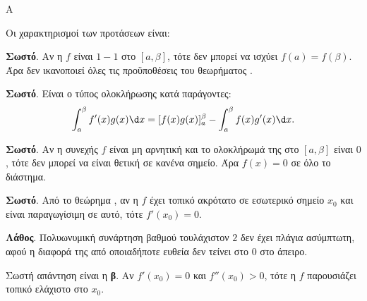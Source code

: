 \begin{thema}{Α}
\begin{erwthma}
\item {}

\item {}

\item {}

\item Οι χαρακτηρισμοί των προτάσεων είναι:
\begin{alist}
\item \textbf{Σωστό}. Αν η $f$ είναι $1-1$ στο $[a,\beta]$, τότε δεν μπορεί να ισχύει $f(a)=f(\beta)$. Άρα δεν ικανοποιεί όλες τις προϋποθέσεις του θεωρήματος .
\item \textbf{Σωστό}. Είναι ο τύπος ολοκλήρωσης κατά παράγοντες:
\[ \dint_a^\beta f'(x)g(x)\d x=[f(x)g(x)]_a^\beta-\dint_a^\beta f(x)g'(x)\d x. \]
\item \textbf{Σωστό}. Αν η συνεχής $f$ είναι μη αρνητική και το ολοκλήρωμά της στο $[a,\beta]$ είναι $0$, τότε δεν μπορεί να είναι θετική σε κανένα σημείο. Άρα $f(x)=0$ σε όλο το διάστημα.
\item \textbf{Σωστό}. Από το θεώρημα , αν η $f$ έχει τοπικό ακρότατο σε εσωτερικό σημείο $x_0$ και είναι παραγωγίσιμη σε αυτό, τότε $f'(x_0)=0$.
\item \textbf{Λάθος}. Πολυωνυμική συνάρτηση βαθμού τουλάχιστον $2$ δεν έχει πλάγια ασύμπτωτη, αφού η διαφορά της από οποιαδήποτε ευθεία δεν τείνει στο $0$ στο άπειρο.
\end{alist}

\item Σωστή απάντηση είναι η \textbf{β}. Αν $f'(x_0)=0$ και $f''(x_0)>0$, τότε η $f$ παρουσιάζει τοπικό ελάχιστο στο $x_0$.
\end{erwthma}
\end{thema}

